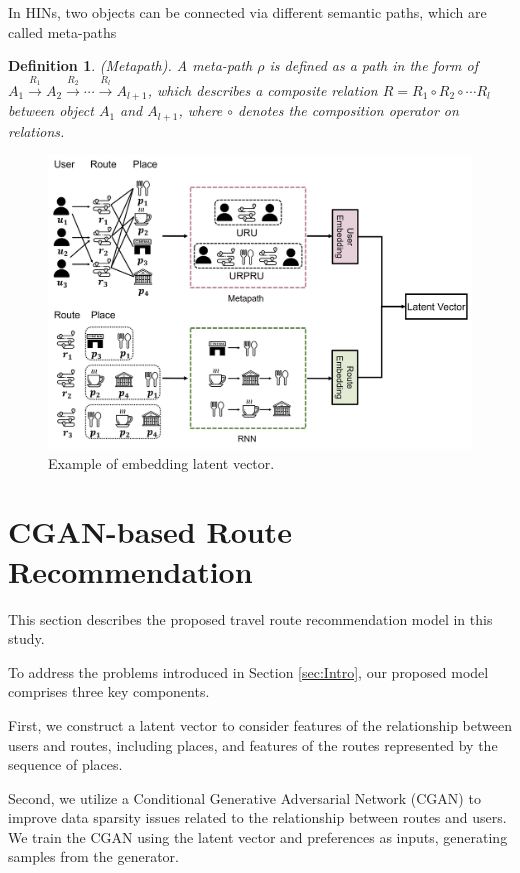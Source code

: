 \documentclass[]{article}
\newtheorem{definition}{Definition}
\begin{document}
In HINs, two objects can be connected via different semantic paths, which are called meta-paths
\begin{definition}
	(Metapath).	A meta-path $\rho$ is defined as a path in the form of $A_{1}\overset{R_{1}}{\rightarrow}A_{2}\overset{R_{2}}{\rightarrow}\cdots \overset{R_{l}}{\rightarrow}A_{l+1}$,  which describes a composite relation $R=R_{1}\circ R_{2}\circ \cdots R_{l}$ between object $A_{1}$ and $A_{l+1}$, where $\circ$ denotes the composition operator on relations. 
\end{definition}
\begin{figure}[htb!]
	\centering
	\includegraphics[width=1\linewidth]{fig/example.jpg}
	\hfil
	\caption{Example of embedding latent vector.}
	\label{fig2}
\end{figure}

\section{CGAN-based Route Recommendation}
\label{sec:Model}
This section describes the proposed travel route recommendation model in this study.

To address the problems introduced in Section \ref{sec:Intro}, our proposed model comprises three key components. 

First, we construct a latent vector to consider features of the relationship between users and routes, including places, and features of the routes represented by the sequence of places. 

Second, we utilize a Conditional Generative Adversarial Network (CGAN) to improve data sparsity issues related to the relationship between routes and users. We train the CGAN using the latent vector and preferences as inputs, generating samples from the generator. 
\end{document}

